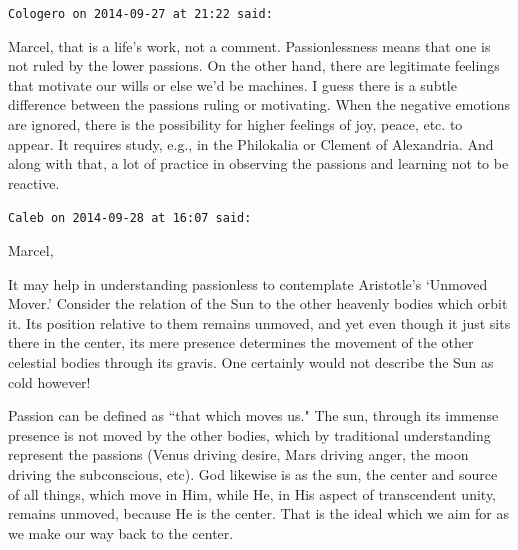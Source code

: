 \begin{footnotesize}
\begin{sffamily}
\hfill

\texttt{Cologero on 2014-09-27 at 21:22 said: }

Marcel, that is a life's work, not a comment. Passionlessness means that one is not ruled by the lower passions. On the other hand, there are legitimate feelings that motivate our wills or else we'd be machines. I guess there is a subtle difference between the passions ruling or motivating. When the negative emotions are ignored, there is the possibility for higher feelings of joy, peace, etc. to appear. It requires study, e.g., in the Philokalia or Clement of Alexandria. And along with that, a lot of practice in observing the passions and learning not to be reactive.


\hfill

\texttt{Caleb on 2014-09-28 at 16:07 said: }

Marcel, 

It may help in understanding passionless to contemplate Aristotle's `Unmoved Mover.' Consider the relation of the Sun to the other heavenly bodies which orbit it. Its position relative to them remains unmoved, and yet even though it just sits there in the center, its mere presence determines the movement of the other celestial bodies through its gravis. One certainly would not describe the Sun as cold however! 

Passion can be defined as ``that which moves us." The sun, through its immense presence is not moved by the other bodies, which by traditional understanding represent the passions (Venus driving desire, Mars driving anger, the moon driving the subconscious, etc). God likewise is as the sun, the center and source of all things, which move in Him, while He, in His aspect of transcendent unity, remains unmoved, because He is the center. That is the ideal which we aim for as we make our way back to the center.


\hfill


\end{sffamily}\end{footnotesize}
